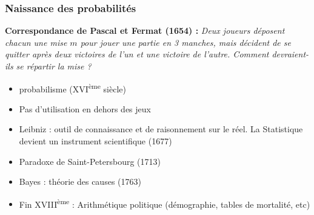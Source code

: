\documentclass{beamer}
\begin{document}




\begin{frame}
\frametitle{Naissance des probabilités}


\textbf{Correspondance de Pascal et Fermat (1654) :} \textit{Deux joueurs déposent chacun une mise $m$ pour jouer une partie en 3 manches, mais décident de se quitter après deux victoires de l'un et une victoire de l'autre. Comment devraient-ils se répartir la mise ?}

\begin{itemize}
\item probabilisme (XVI\textsuperscript{ème} siècle)
\item Pas d'utilisation en dehors des jeux
\item Leibniz : outil de connaissance et de raisonnement sur le réel. La Statistique devient un instrument scientifique (1677)
\item Paradoxe de Saint-Petersbourg (1713)
\item  Bayes : théorie des causes (1763)
\item Fin XVIII\textsuperscript{ème} : Arithmétique politique (démographie, tables de mortalité, etc)
\end{itemize}
\end{frame}
\end{document}
